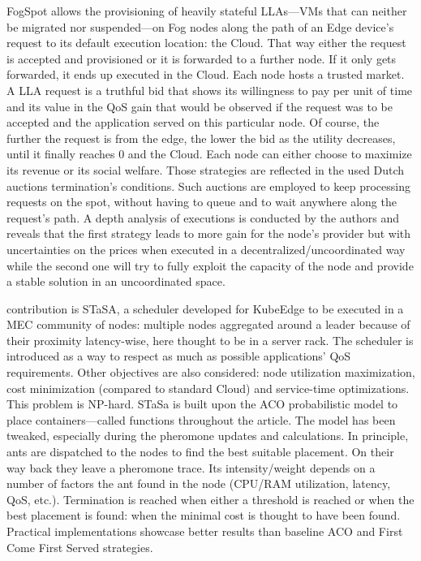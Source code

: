 \begin{description}[leftmargin=10pt]
	\item[\citeposs{tasiopoulos_fogspot_2019}] FogSpot allows the provisioning of heavily stateful \glspl{LLA}—\glspl{VM} that can neither be migrated nor suspended—on Fog nodes along the path of an Edge device's request to its default execution location: the Cloud. That way either the request is accepted and provisioned or it is forwarded to a further node. If it only gets forwarded, it ends up executed in the Cloud.
		Each node hosts a trusted market. A \gls{LLA} request is a truthful bid that shows its willingness to pay per unit of time and its value in the \gls{QoS} gain that would be observed if the request was to be accepted and the application served on this particular node. Of course, the further the request is from the edge, the lower the bid as the utility decreases, until it finally reaches 0 and the Cloud.
		Each node can either choose to maximize its revenue or its social welfare. Those strategies are reflected in the used Dutch auctions termination's conditions. Such auctions are employed to keep processing requests on the spot, without having to queue and to wait anywhere along the request's path. A depth analysis of executions is conducted by the authors and reveals that the first strategy leads to more gain for the node's provider but with uncertainties on the prices when executed in a decentralized/uncoordinated way while the second one will try to fully exploit the capacity of the node and provide a stable solution in an uncoordinated space.

	\item[\citeposs{mutichiro_qos-based_2021}] contribution is STaSA, a scheduler developed for KubeEdge to be executed in a \gls{MEC} community of nodes: multiple nodes aggregated around a leader because of their proximity latency-wise, here thought to be in a server rack. The scheduler is introduced as a way to respect as much as possible applications' \gls{QoS} requirements. Other objectives are also considered: node utilization maximization, cost minimization (compared to standard Cloud) and service-time optimizations. This problem is NP-hard. STaSa is built upon the \gls{ACO} probabilistic model to place containers—called functions throughout the article. The model has been tweaked, especially during the pheromone updates and calculations. In principle, ants are dispatched to the nodes to find the best suitable placement. On their way back they leave a pheromone trace. Its intensity/weight depends on a number of factors the ant found in the node (CPU/RAM utilization, latency, \gls{QoS}, etc.). Termination is reached when either a threshold is reached or when the best placement is found: when the minimal cost is thought to have been found. Practical implementations showcase better results than baseline \gls{ACO} and First Come First Served strategies.


\end{description}
